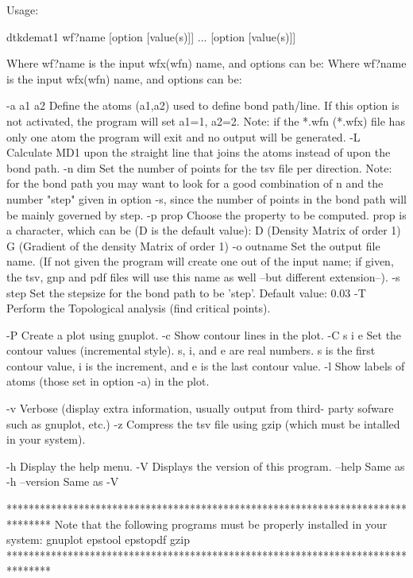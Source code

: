 

Usage:

	dtkdemat1 wf?name [option [value(s)]] ... [option [value(s)]]

Where wf?name is the input wfx(wfn) name, and options can be:
Where wf?name is the input wfx(wfn) name, and options can be:

  -a a1 a2  	Define the atoms  (a1,a2) used to define bond path/line.
            	  If this option is not activated, the program will 
            	  set a1=1, a2=2.
            	  Note: if the *.wfn (*.wfx) file has only one atom
            	  the program will exit and no output will be generated.
  -L        	Calculate MD1 upon the straight line that joins the atoms
            	  instead of upon the bond path.
  -n  dim   	Set the number of points for the tsv file per direction.
            	  Note: for the bond path you may want to look for a good 
            	  combination of n and the number "step" given in option -s,
            	  since the number of points in the bond path will be mainly 
            	  governed by step.
  -p prop   	Choose the property to be computed. prop is a character,
            	  which can be (D is the default value):
            	      D (Density Matrix of order 1)
            	      G (Gradient of the density Matrix of order 1)
  -o outname	Set the output file name.
            	  (If not given the program will create one out of
            	  the input name; if given, the tsv, gnp and pdf files will
            	  use this name as well --but different extension--).
  -s step   	Set the stepsize for the bond path to be 'step'.
            	  Default value: 0.03
  -T        	Perform the Topological analysis (find critical points).

  -P        	Create a plot using gnuplot.
  -c        	Show contour lines in the plot.
  -C s i e  	Set the contour values (incremental style).
            	  s, i, and e are real numbers. s is the first
            	  contour value, i is the increment, and 
            	  e is the last contour value.
  -l     	Show labels of atoms (those set in option -a) in the plot.

  -v     	Verbose (display extra information, usually output from third-
         	  party sofware such as gnuplot, etc.)
  -z     	Compress the tsv file using gzip (which must be intalled
         	   in your system).

  -h     	Display the help menu.
  -V     	Displays the version of this program.
  --help    		Same as -h
  --version 		Same as -V

********************************************************************************
  Note that the following programs must be properly installed in your system:
                                    gnuplot
                                    epstool
                                    epstopdf
                                      gzip
********************************************************************************
